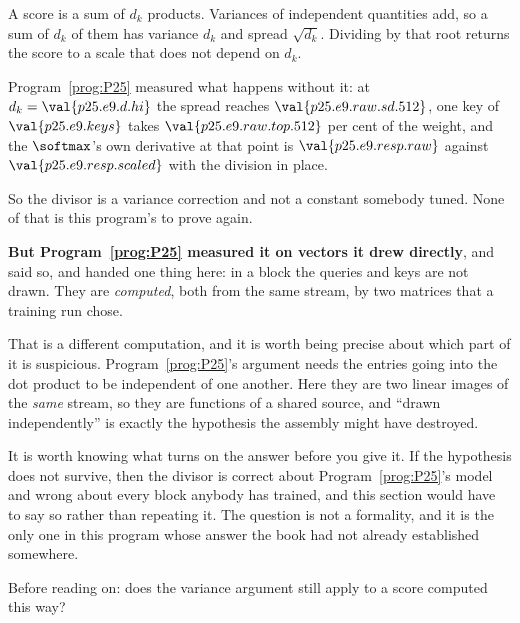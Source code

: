 \begin{fr}
\begin{ansblock}
A score is a sum of $d_k$ products. Variances of independent quantities add,
so a sum of $d_k$ of them has variance $d_k$ and spread $\sqrt{d_k}$.
Dividing by that root returns the score to a scale that does not depend on
$d_k$.
\end{ansblock}

Program~\ref{prog:P25} measured what happens without it: at
$d_k = \val{p25.e9.d.hi}$ the spread reaches $\val{p25.e9.raw.sd.512}$, one
key of $\val{p25.e9.keys}$ takes $\val{p25.e9.raw.top.512}$ per cent of the
weight, and the $\softmax$'s own derivative at that point is
$\val{p25.e9.resp.raw}$ against $\val{p25.e9.resp.scaled}$ with the division
in place.

So the divisor is a variance correction and not a constant somebody tuned.
None of that is this program's to prove again.

\textbf{But Program~\ref{prog:P25} measured it on vectors it drew directly},
and said so, and handed one thing here: in a block the queries and keys are
not drawn. They are \emph{computed}, both from the same stream, by two
matrices that a training run chose.

That is a different computation, and it is worth being precise about which
part of it is suspicious. Program~\ref{prog:P25}'s argument needs the entries
going into the dot product to be independent of one another. Here they are two
linear images of the \emph{same} stream, so they are functions of a shared
source, and \enquote{drawn independently} is exactly the hypothesis the
assembly might have destroyed.

It is worth knowing what turns on the answer before you give it. If the
hypothesis does not survive, then the divisor is correct about
Program~\ref{prog:P25}'s model and wrong about every block anybody has
trained, and this section would have to say so rather than repeating it. The
question is not a formality, and it is the only one in this program whose
answer the book had not already established somewhere.

Before reading on: does the variance argument still apply to a score computed
this way?
\dotline
\nextframe
\end{fr}


